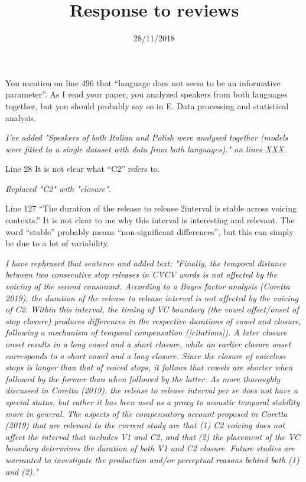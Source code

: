 \documentclass[]{article}
\title{Response to reviews}
\date{28/11/2018}
\begin{document}
\maketitle

You mention on line 496 that ``language does not seem to be an
informative parameter''. As I read your paper, you analyzed speakers
from both languages together, but you should probably say so in E. Data
processing and statistical analysis.

\begin{adjustwidth}{1cm}{} \textit{
I've added "Speakers of both Italian and Polish were analysed together (models were fitted to a single dataset with data from both languages)." on lines XXX.
} \end{adjustwidth}

Line 28 It is not clear what ``C2'' refers to.

\begin{adjustwidth}{1cm}{} \textit{
Replaced "C2" with "closure".
} \end{adjustwidth}

Line 127 ``The duration of the release to release 2interval is stable
across voicing contexts.'' It is not clear to me why this interval is
interesting and relevant. The word ``stable'' probably means
``non-significant differences'', but this can simply be due to a lot of
variability.

\begin{adjustwidth}{1cm}{} \textit{
I have rephrased that sentence and added text:
"Finally, the temporal distance between two consecutive stop releases in CV́CV words is not affected by the voicing of the second consonant.
According to a Bayes factor analysis (Coretta 2019), the duration of the release to release interval is not affected by the voicing of C2.
Within this interval, the timing of VC boundary (the vowel offset/onset of stop closure) produces differences in the respective durations of vowel and closure, following a mechanism of temporal compensation ([citations]).
A later closure onset results in a long vowel and a short closure, while an earlier closure onset corresponds to a short vowel and a long closure.
Since the closure of voiceless stops is longer than that of voiced stops, it follows that vowels are shorter when followed by the former than when followed by the latter.
As more thoroughly discussed in Coretta (2019), the release to release interval per se does not have a special status, but rather it has been used as a proxy to acoustic temporal stability more in general.
The aspects of the compensatory account proposed in Coretta (2019) that are relevant to the current study are that (1) C2 voicing does not affect the interval that includes V1 and C2, and that (2) the placement of the VC boundary determines the duration of both V1 and C2 closure.
Future studies are warranted to investigate the production and/or perceptual reasons behind both (1) and (2)."
} \end{adjustwidth}
\end{document}
